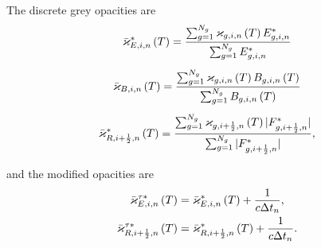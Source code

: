 	\iffalse
	In discrete space the GLOQD-POD ROM is
	\begin{subequations}
		\begin{gather}
			\Fbirn - \Fbiln + c\delxi\amodkapebin\pr{T}\ebin = c\kapbbin^*\pr{T}\ar T^4_{i,n} + \frac{\ebinl}{\deltn}
		\end{gather}
		\vspace*{-1.2cm}
		\begin{multline}
			c\pr{\fbirrn^*\ebirrn - \fbin^*\ebin} + \delxir\amodkaprbirn\pr{T}\Fbirn \\+ \pr{\aetairnp\ebirrn - \aetairnm\ebin} = \delxir\frac{\Fbirnl}{c\deltn}
		\end{multline}
		\vspace*{-.9cm}
		\begin{gather}
			\frac{\varepsilon_{i,n}\pr{T} - \varepsilon_{i,n-1}\pr{T}}{\delt_n} = c\kapebin^*\ebin - c\ar\kapbbin^*\tin^4\\
			i = 1,\dots,I, \ n = 1,\dots,N_n \nn
		\end{gather}
	\end{subequations}
	\fi
	
	
	\iffalse
	 as the elements of the $n^{\text{th}}$ column of the low-rank SVD of $\bA_g^f$ and $\bA_g^E$ respectively
	\begin{equation}
		\fgin^* = \Big(a^{f*}_{i,n}\Big)_g, \ \
		\egin^* = \Big(a^{E*}_{i,n}\Big)_g,
	\end{equation}
	
	with $\pr{a^{f*}_{i,n}}_g$ and $\pr{a^{E*}_{i,n}}_g$ as the $\pr{i,n}$ element of the matrices $\bA_g^{f*}$ and $\bA_g^{E*}$.
	\fi
	 
	
	\iffalse
	The discrete grey opacities are
	\begin{subequations}
		\begin{gather}
			\bar{\varkappa}_{E,i,n}^*\left( T\right) = \frac{ \sum_{g=1}^{N_g}\varkappa_{g,i,n}\left( T\right)E_{g,i,n}^* }{ \sum_{g=1}^{N_g}E_{g,i,n}^* } \\[5pt]
			\bar{\varkappa}_{B,i,n}\left( T\right) = \frac{ \sum_{g=1}^{N_g}\varkappa_{g,i,n}\left( T\right)B_{g,i,n}\left( T\right) }{ \sum_{g=1}^{N_g}B_{g,i,n}\left( T\right) } \\[5pt]
			\bar{\varkappa}_{R,i+\frac{1}{2},n}^*\left( T\right) = \frac{ \sum_{g=1}^{N_g}\varkappa_{g,i+\frac{1}{2},n}\left( T\right)|F_{g,i+\frac{1}{2},n}^*| }{ \sum_{g=1}^{N_g}|F_{g,i+\frac{1}{2},n}^*| },
		\end{gather}
	\end{subequations}
	
	and the modified opacities are
	\begin{subequations}
	\begin{gather}
		\bar{\varkappa}_{E,i,n}^{\tau*}\left( T\right) = \bar{\varkappa}_{E,i,n}^*\left( T\right) + \frac{1}{c\Delta t_n}, \\
		\bar{\varkappa}_{R,i+\frac{1}{2},n}^{\tau*}\left( T\right) = \bar{\varkappa}_{R,i+\frac{1}{2},n}^*\left( T\right) + \frac{1}{c\Delta t_n}.
	\end{gather}
	\end{subequations}
	
